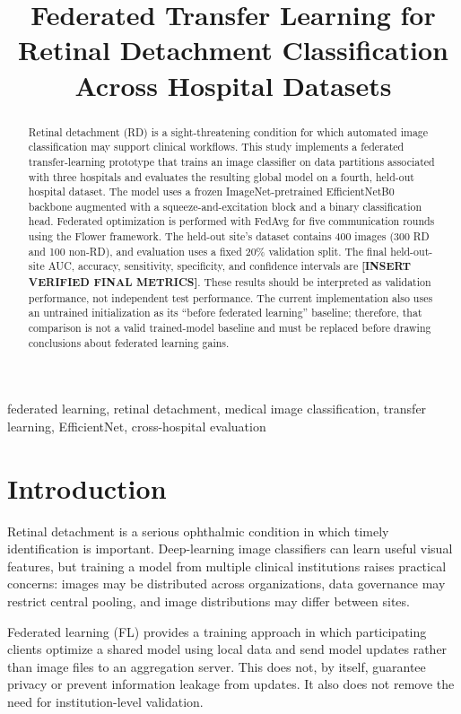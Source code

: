 \documentclass[conference]{IEEEtran}
\title{Federated Transfer Learning for Retinal Detachment Classification Across Hospital Datasets}
\author{
\IEEEauthorblockN{[Author Name(s)]}
\IEEEauthorblockA{[Department, Institution]\\
[City, Country]\\
[Email address(es)]}
}
\begin{document}
\maketitle

\begin{abstract}
Retinal detachment (RD) is a sight-threatening condition for which automated image classification may support clinical workflows. This study implements a federated transfer-learning prototype that trains an image classifier on data partitions associated with three hospitals and evaluates the resulting global model on a fourth, held-out hospital dataset. The model uses a frozen ImageNet-pretrained EfficientNetB0 backbone augmented with a squeeze-and-excitation block and a binary classification head. Federated optimization is performed with FedAvg for five communication rounds using the Flower framework. The held-out site's dataset contains 400 images (300 RD and 100 non-RD), and evaluation uses a fixed 20\% validation split. The final held-out-site AUC, accuracy, sensitivity, specificity, and confidence intervals are \textbf{[INSERT VERIFIED FINAL METRICS]}. These results should be interpreted as validation performance, not independent test performance. The current implementation also uses an untrained initialization as its ``before federated learning'' baseline; therefore, that comparison is not a valid trained-model baseline and must be replaced before drawing conclusions about federated learning gains.
\end{abstract}

\begin{IEEEkeywords}
federated learning, retinal detachment, medical image classification, transfer learning, EfficientNet, cross-hospital evaluation
\end{IEEEkeywords}

\section{Introduction}
Retinal detachment is a serious ophthalmic condition in which timely identification is important. Deep-learning image classifiers can learn useful visual features, but training a model from multiple clinical institutions raises practical concerns: images may be distributed across organizations, data governance may restrict central pooling, and image distributions may differ between sites.

Federated learning (FL) provides a training approach in which participating clients optimize a shared model using local data and send model updates rather than image files to an aggregation server. This does not, by itself, guarantee privacy or prevent information leakage from updates. It also does not remove the need for institution-level validation.
\end{document}

